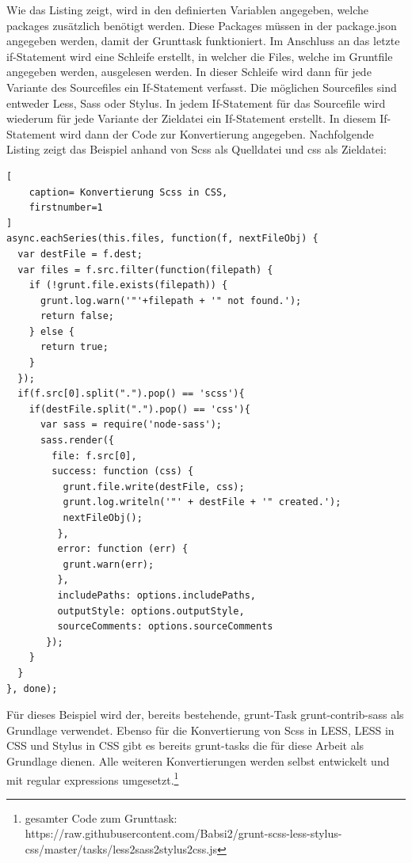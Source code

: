 Wie das Listing zeigt, wird in den definierten Variablen angegeben, welche packages zusätzlich benötigt werden. Diese Packages müssen in der package.json angegeben werden, damit der Grunttask funktioniert.\newline
Im Anschluss an das letzte if-Statement wird eine Schleife erstellt, in welcher die Files, welche im Gruntfile angegeben werden, ausgelesen werden.  In dieser Schleife wird dann für jede Variante des Sourcefiles ein If-Statement verfasst. Die möglichen Sourcefiles sind entweder Less, Sass oder Stylus. \newline
In jedem If-Statement für das Sourcefile wird wiederum für jede Variante der Zieldatei ein If-Statement erstellt. In diesem If-Statement wird dann der Code zur Konvertierung angegeben.
Nachfolgende Listing zeigt das Beispiel anhand von Scss als Quelldatei und css als Zieldatei:
\begin{lstlisting}[
	caption= Konvertierung Scss in CSS,
	firstnumber=1
]
async.eachSeries(this.files, function(f, nextFileObj) {
  var destFile = f.dest;	
  var files = f.src.filter(function(filepath) {
    if (!grunt.file.exists(filepath)) {
      grunt.log.warn('"'+filepath + '" not found.');
      return false;
    } else {
      return true;
    }
  });
  if(f.src[0].split(".").pop() == 'scss'){
    if(destFile.split(".").pop() == 'css'){
      var sass = require('node-sass');
      sass.render({
        file: f.src[0],
        success: function (css) {
		  grunt.file.write(destFile, css);
		  grunt.log.writeln('"' + destFile + '" created.');
		  nextFileObj();
         },
         error: function (err) {
		  grunt.warn(err);
         },
         includePaths: options.includePaths,
         outputStyle: options.outputStyle,
         sourceComments: options.sourceComments
       });
    }
  }
}, done);
\end{lstlisting}
Für dieses Beispiel wird der, bereits bestehende, grunt-Task \glqq{}grunt-contrib-sass\grqq{} als Grundlage verwendet. \newline
Ebenso für die Konvertierung von Scss in LESS, LESS in CSS und Stylus in CSS gibt es bereits grunt-tasks die für diese Arbeit als Grundlage dienen.\newline
Alle weiteren Konvertierungen werden selbst entwickelt und mit regular expressions umgesetzt.\footnote[3]{gesamter Code zum Grunttask: https://raw.githubusercontent.com/Babsi2/grunt-scss-less-stylus-css/master/tasks/less2sass2stylus2css.js}\newline

